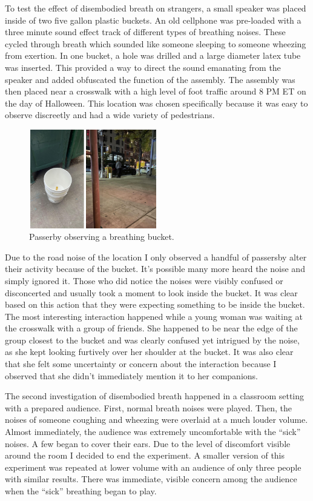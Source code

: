 \documentclass[letterpaper]{article}
\begin{document}
To test the effect of disembodied breath on strangers, a small speaker was placed inside of two five gallon plastic buckets. An old cellphone was pre-loaded with a three minute sound effect track of different types of breathing noises. These cycled through breath which sounded like someone sleeping to someone wheezing from exertion. In one bucket, a hole was drilled and a large diameter latex tube was inserted. This provided a way to direct the sound emanating from the speaker and added obfuscated the function of the assembly. The assembly was then placed near a crosswalk with a high level of foot traffic around 8 PM ET on the day of Halloween. This location was chosen specifically because it was easy to observe discreetly and had a wide variety of pedestrians. 

\begin{figure}[h]
\includegraphics[width=0.5\textwidth]{images/buckettest.png}
\caption{Passerby observing a breathing bucket.}
\end{figure}

Due to the road noise of the location I only observed a handful of passersby alter their activity because of the bucket. It's possible many more heard the noise and simply ignored it. Those who did notice the noises were visibly confused or disconcerted and usually took a moment to look inside the bucket. It was clear based on this action that they were expecting something to be inside the bucket. The most interesting interaction happened while a young woman was waiting at the crosswalk with a group of friends. She happened to be near the edge of the group closest to the bucket and was clearly confused yet intrigued by the noise, as she kept looking furtively over her shoulder at the bucket. It was also clear that she felt some uncertainty or concern about the interaction because I observed that she didn’t immediately mention it to her companions.

The second investigation of disembodied breath happened in a classroom setting with a prepared audience. First, normal breath noises were played. Then, the noises of someone coughing and wheezing were overlaid at a much louder volume. Almost immediately, the audience was extremely uncomfortable with the ``sick'' noises. A few began to cover their ears. Due to the level of discomfort visible around the room I decided to end the experiment. A smaller version of this experiment was repeated at lower volume with an audience of only three people with similar results. There was immediate, visible concern among the audience when the ``sick'' breathing began to play.
\end{document}

